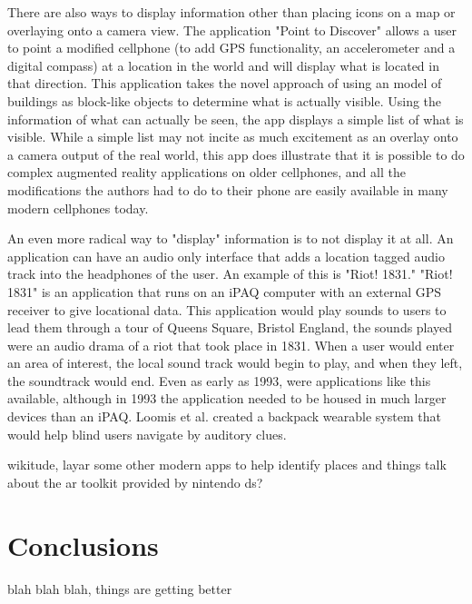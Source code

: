 \documentclass{acm_proc_article-sp}
\begin{document}
There are also ways to display information other than placing icons on a map or overlaying onto a camera view.  The application "Point to Discover" allows a user to point a modified cellphone (to add GPS functionality, an accelerometer and a digital compass) at a location in the world and will display what is located in that direction.  This application takes the novel approach of using an model of buildings as block-like objects to determine what is actually visible.  Using the information of what can actually be seen, the app displays a simple list of what is visible. While a simple list may not incite as much excitement as an overlay onto a camera output of the real world, this app does illustrate that it is possible to do complex augmented reality applications on older cellphones, and all the modifications the authors had to do to their phone are easily available in many modern cellphones today. \cite{simonpoint}

An even more radical way to "display" information is to not display it at all.  An application can have an audio only interface that adds a location tagged audio track into the headphones of the user.  An example of this is "Riot! 1831." "Riot! 1831" is an application that runs on an iPAQ computer with an external GPS receiver to give locational data. This application would play sounds to users to lead them through a tour of Queens Square, Bristol England, the sounds played were an audio drama of a riot that took place in 1831.  When a user would enter an area of interest, the local sound track would begin to play, and when they left, the soundtrack would end. \cite{reid2004riot} \cite{reid2005parallel}   Even as early as 1993, were applications like this available, although in 1993 the application needed to be housed in much larger devices than an iPAQ.  Loomis et al. created a backpack wearable system that would help blind users navigate by auditory clues. \cite{loomis1994personal}

wikitude, layar
some other modern apps to help identify places and things
talk about the ar toolkit provided by nintendo ds?

\section{Conclusions}
blah blah blah, things are getting better



\end{document}
